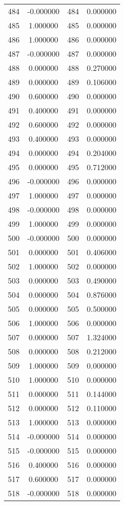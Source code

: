 \documentclass[12pt]{article}
\begin{document}
\begin{longtable}{@{}cccc@{}}
484 & -0.000000 & 484 & 0.000000 \\
485 & 1.000000 & 485 & 0.000000 \\
486 & 1.000000 & 486 & 0.000000 \\
487 & -0.000000 & 487 & 0.000000 \\
488 & 0.000000 & 488 & 0.270000 \\
489 & 0.000000 & 489 & 0.106000 \\
490 & 0.600000 & 490 & 0.000000 \\
491 & 0.400000 & 491 & 0.000000 \\
492 & 0.600000 & 492 & 0.000000 \\
493 & 0.400000 & 493 & 0.000000 \\
494 & 0.000000 & 494 & 0.204000 \\
495 & 0.000000 & 495 & 0.712000 \\
496 & -0.000000 & 496 & 0.000000 \\
497 & 1.000000 & 497 & 0.000000 \\
498 & -0.000000 & 498 & 0.000000 \\
499 & 1.000000 & 499 & 0.000000 \\
500 & -0.000000 & 500 & 0.000000 \\
501 & 0.000000 & 501 & 0.406000 \\
502 & 1.000000 & 502 & 0.000000 \\
503 & 0.000000 & 503 & 0.490000 \\
504 & 0.000000 & 504 & 0.876000 \\
505 & 0.000000 & 505 & 0.500000 \\
506 & 1.000000 & 506 & 0.000000 \\
507 & 0.000000 & 507 & 1.324000 \\
508 & 0.000000 & 508 & 0.212000 \\
509 & 1.000000 & 509 & 0.000000 \\
510 & 1.000000 & 510 & 0.000000 \\
511 & 0.000000 & 511 & 0.144000 \\
512 & 0.000000 & 512 & 0.110000 \\
513 & 1.000000 & 513 & 0.000000 \\
514 & -0.000000 & 514 & 0.000000 \\
515 & -0.000000 & 515 & 0.000000 \\
516 & 0.400000 & 516 & 0.000000 \\
517 & 0.600000 & 517 & 0.000000 \\
518 & -0.000000 & 518 & 0.000000 \\

\end{longtable}
\end{document}

